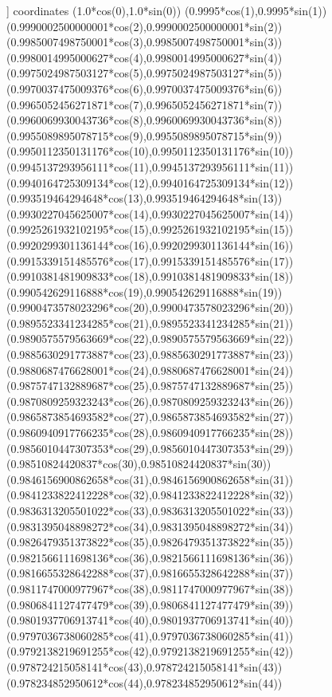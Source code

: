 ] coordinates {
({1.0*cos(0)},{1.0*sin(0)})
({0.9995*cos(1)},{0.9995*sin(1)})
({0.9990002500000001*cos(2)},{0.9990002500000001*sin(2)})
({0.9985007498750001*cos(3)},{0.9985007498750001*sin(3)})
({0.9980014995000627*cos(4)},{0.9980014995000627*sin(4)})
({0.9975024987503127*cos(5)},{0.9975024987503127*sin(5)})
({0.9970037475009376*cos(6)},{0.9970037475009376*sin(6)})
({0.9965052456271871*cos(7)},{0.9965052456271871*sin(7)})
({0.9960069930043736*cos(8)},{0.9960069930043736*sin(8)})
({0.9955089895078715*cos(9)},{0.9955089895078715*sin(9)})
({0.9950112350131176*cos(10)},{0.9950112350131176*sin(10)})
({0.9945137293956111*cos(11)},{0.9945137293956111*sin(11)})
({0.9940164725309134*cos(12)},{0.9940164725309134*sin(12)})
({0.993519464294648*cos(13)},{0.993519464294648*sin(13)})
({0.9930227045625007*cos(14)},{0.9930227045625007*sin(14)})
({0.9925261932102195*cos(15)},{0.9925261932102195*sin(15)})
({0.9920299301136144*cos(16)},{0.9920299301136144*sin(16)})
({0.9915339151485576*cos(17)},{0.9915339151485576*sin(17)})
({0.9910381481909833*cos(18)},{0.9910381481909833*sin(18)})
({0.990542629116888*cos(19)},{0.990542629116888*sin(19)})
({0.9900473578023296*cos(20)},{0.9900473578023296*sin(20)})
({0.9895523341234285*cos(21)},{0.9895523341234285*sin(21)})
({0.9890575579563669*cos(22)},{0.9890575579563669*sin(22)})
({0.9885630291773887*cos(23)},{0.9885630291773887*sin(23)})
({0.9880687476628001*cos(24)},{0.9880687476628001*sin(24)})
({0.9875747132889687*cos(25)},{0.9875747132889687*sin(25)})
({0.9870809259323243*cos(26)},{0.9870809259323243*sin(26)})
({0.9865873854693582*cos(27)},{0.9865873854693582*sin(27)})
({0.9860940917766235*cos(28)},{0.9860940917766235*sin(28)})
({0.9856010447307353*cos(29)},{0.9856010447307353*sin(29)})
({0.98510824420837*cos(30)},{0.98510824420837*sin(30)})
({0.9846156900862658*cos(31)},{0.9846156900862658*sin(31)})
({0.9841233822412228*cos(32)},{0.9841233822412228*sin(32)})
({0.9836313205501022*cos(33)},{0.9836313205501022*sin(33)})
({0.9831395048898272*cos(34)},{0.9831395048898272*sin(34)})
({0.9826479351373822*cos(35)},{0.9826479351373822*sin(35)})
({0.9821566111698136*cos(36)},{0.9821566111698136*sin(36)})
({0.9816655328642288*cos(37)},{0.9816655328642288*sin(37)})
({0.9811747000977967*cos(38)},{0.9811747000977967*sin(38)})
({0.9806841127477479*cos(39)},{0.9806841127477479*sin(39)})
({0.9801937706913741*cos(40)},{0.9801937706913741*sin(40)})
({0.9797036738060285*cos(41)},{0.9797036738060285*sin(41)})
({0.9792138219691255*cos(42)},{0.9792138219691255*sin(42)})
({0.978724215058141*cos(43)},{0.978724215058141*sin(43)})
({0.978234852950612*cos(44)},{0.978234852950612*sin(44)})
}
